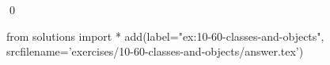 
\begin{ex}
  \label{ex:10-60-classes-and-objects}
  
  \qed
\end{ex}
\begin{python0}
from solutions import *
add(label="ex:10-60-classes-and-objects",
    srcfilename='exercises/10-60-classes-and-objects/answer.tex')
\end{python0}

